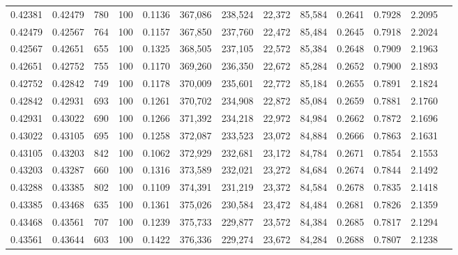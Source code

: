 \begin{tabular}{rrrrrrrrrrrrr}
0.42381 & 0.42479 &   780 & 100 &                                     0.1136 & 367,086 & 238,524 &  22,372 &  85,584 & 0.2641 & 0.7928 & 2.2095 \\
0.42479 & 0.42567 &   764 & 100 &                                     0.1157 & 367,850 & 237,760 &  22,472 &  85,484 & 0.2645 & 0.7918 & 2.2024 \\
0.42567 & 0.42651 &   655 & 100 &                                     0.1325 & 368,505 & 237,105 &  22,572 &  85,384 & 0.2648 & 0.7909 & 2.1963 \\
0.42651 & 0.42752 &   755 & 100 &                                     0.1170 & 369,260 & 236,350 &  22,672 &  85,284 & 0.2652 & 0.7900 & 2.1893 \\
0.42752 & 0.42842 &   749 & 100 &                                     0.1178 & 370,009 & 235,601 &  22,772 &  85,184 & 0.2655 & 0.7891 & 2.1824 \\
0.42842 & 0.42931 &   693 & 100 &                                     0.1261 & 370,702 & 234,908 &  22,872 &  85,084 & 0.2659 & 0.7881 & 2.1760 \\
0.42931 & 0.43022 &   690 & 100 &                                     0.1266 & 371,392 & 234,218 &  22,972 &  84,984 & 0.2662 & 0.7872 & 2.1696 \\
0.43022 & 0.43105 &   695 & 100 &                                     0.1258 & 372,087 & 233,523 &  23,072 &  84,884 & 0.2666 & 0.7863 & 2.1631 \\
0.43105 & 0.43203 &   842 & 100 &                                     0.1062 & 372,929 & 232,681 &  23,172 &  84,784 & 0.2671 & 0.7854 & 2.1553 \\
0.43203 & 0.43287 &   660 & 100 &                                     0.1316 & 373,589 & 232,021 &  23,272 &  84,684 & 0.2674 & 0.7844 & 2.1492 \\
0.43288 & 0.43385 &   802 & 100 &                                     0.1109 & 374,391 & 231,219 &  23,372 &  84,584 & 0.2678 & 0.7835 & 2.1418 \\
0.43385 & 0.43468 &   635 & 100 &                                     0.1361 & 375,026 & 230,584 &  23,472 &  84,484 & 0.2681 & 0.7826 & 2.1359 \\
0.43468 & 0.43561 &   707 & 100 &                                     0.1239 & 375,733 & 229,877 &  23,572 &  84,384 & 0.2685 & 0.7817 & 2.1294 \\
0.43561 & 0.43644 &   603 & 100 &                                     0.1422 & 376,336 & 229,274 &  23,672 &  84,284 & 0.2688 & 0.7807 & 2.1238 \\

\end{tabular}
